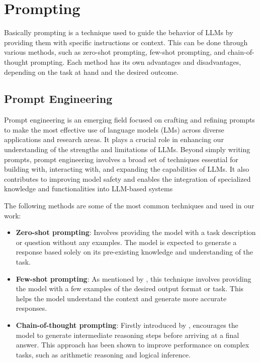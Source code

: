 \section{Prompting}

Basically prompting is a technique used to guide the behavior of LLMs by providing them with specific instructions or context. 
This can be done through various methods, such as zero-shot prompting, few-shot prompting, and chain-of-thought prompting. 
Each method has its own advantages and disadvantages, depending on the task at hand and the desired outcome.


\subsection{Prompt Engineering}

Prompt engineering is an emerging field focused on crafting and refining prompts to make the most effective use of language models (LMs) 
across diverse applications and research areas. It plays a crucial role in enhancing our understanding of the strengths and limitations of LLMs. 
Beyond simply writing prompts, prompt engineering involves a broad set of techniques essential for building with, interacting with, and expanding the capabilities of LLMs. 
It also contributes to improving model safety and enables the integration of specialized knowledge and functionalities into LLM-based systems

The following methods are some of the most common techniques and used in our work:

\begin{itemize}
    \item \textbf{Zero-shot prompting}: Involves providing the model with a task description or question without any examples. The model is expected to generate a response based solely on its pre-existing knowledge and understanding of the task.
    \item \textbf{Few-shot prompting}: As mentioned by \cite{gpt3Paper}, this technique involves providing the model with a few examples of the desired output format or task. This helps the model understand the context and generate more accurate responses.
    \item \textbf{Chain-of-thought prompting}: Firstly introduced by \cite{chainofthought2023}, encourages the model to generate intermediate reasoning steps before arriving at a final answer. This approach has been shown to improve performance on complex tasks, such as arithmetic reasoning and logical inference.
\end{itemize}




